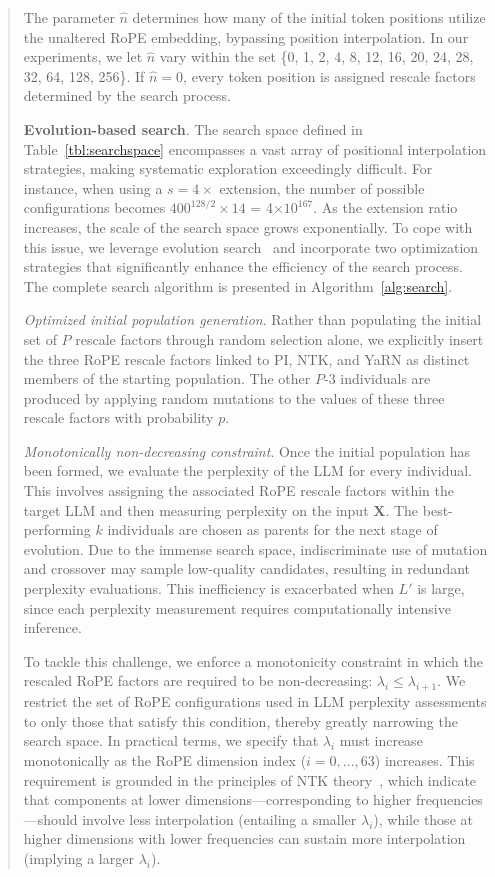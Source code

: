 \begin{abstract}
The parameter $\hat{n}$ determines how many of the initial token positions utilize the unaltered RoPE embedding, bypassing position interpolation. In our experiments, we let $\hat{n}$ vary within the set \{0, 1, 2, 4, 8, 12, 16, 20, 24, 28, 32, 64, 128, 256\}. If $\hat{n}=0$, every token position is assigned rescale factors determined by the search process.

\textbf{Evolution-based search}. The search space defined in Table~\ref{tbl:searchspace} encompasses a vast array of positional interpolation strategies, making systematic exploration exceedingly difficult. For instance, when using a $s=4\times$ extension, the number of possible configurations becomes $400^{128/2}\times14$ = 4$\times10^{167}$. As the extension ratio increases, the scale of the search space grows exponentially. To cope with this issue, we leverage evolution search~\cite{guo2020single} and incorporate two optimization strategies that significantly enhance the efficiency of the search process. The complete search algorithm is presented in Algorithm~\ref{alg:search}.

\textit{Optimized initial population generation}. Rather than populating the initial set of $P$ rescale factors through random selection alone, we explicitly insert the three RoPE rescale factors linked to PI, NTK, and YaRN as distinct members of the starting population. The other $P$-3 individuals are produced by applying random mutations to the values of these three rescale factors with probability $p$.

\textit{Monotonically non-decreasing constraint}. Once the initial population has been formed, we evaluate the perplexity of the LLM for every individual. This involves assigning the associated RoPE rescale factors within the target LLM and then measuring perplexity on the input $\mathbf{X}$. The best-performing $k$ individuals are chosen as parents for the next stage of evolution. Due to the immense search space, indiscriminate use of mutation and crossover may sample low-quality candidates, resulting in redundant perplexity evaluations. This inefficiency is exacerbated when $L'$ is large, since each perplexity measurement requires computationally intensive inference.

To tackle this challenge, we enforce a monotonicity constraint in which the rescaled RoPE factors are required to be non-decreasing: $\lambda_i\le \lambda_{i+1}$. We restrict the set of RoPE configurations used in LLM perplexity assessments to only those that satisfy this condition, thereby greatly narrowing the search space. In practical terms, we specify that $\lambda_i$ must increase monotonically as the RoPE dimension index ($i=0,...,63$) increases. This requirement is grounded in the principles of NTK theory~\cite{jacot2018neural,tancik2020fourier,ntk}, which indicate that components at lower dimensions—corresponding to higher frequencies—should involve less interpolation (entailing a smaller $\lambda_i$), while those at higher dimensions with lower frequencies can sustain more interpolation (implying a larger $\lambda_i$).


\end{abstract}
